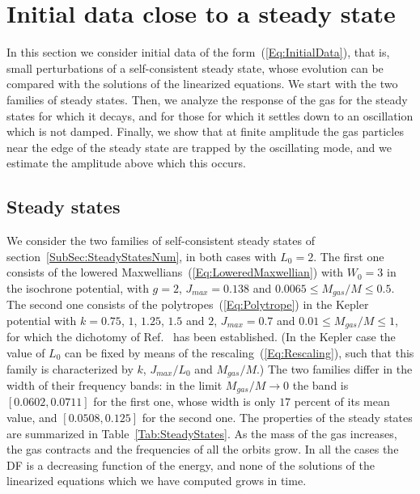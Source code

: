 \section{Initial data close to a steady state}
\label{Sec:FixedL}

In this section we consider initial data of the form~(\ref{Eq:InitialData}), that is, small perturbations of a self-consistent steady state, whose evolution can be compared with the solutions of the linearized equations. We start with the two families of steady states. Then, we analyze the response of the gas for the steady states for which it decays, and for those for which it settles down to an oscillation which is not damped. Finally, we show that at finite amplitude the gas particles near the edge of the steady state are trapped by the oscillating mode, and we estimate the amplitude above which this occurs.


\subsection{Steady states}
\label{SubSec:FixedLStates}

We consider the two families of self-consistent steady states of section~\ref{SubSec:SteadyStatesNum}, in both cases with $L_0 = 2$. The first one consists of the lowered Maxwellians~(\ref{Eq:LoweredMaxwellian}) with $W_0 = 3$ in the isochrone potential, with $g = 2$, $J_{max} = 0.138$ and $0.0065\leq M_{gas}/M\leq 0.5$. The second one consists of the polytropes~(\ref{Eq:Polytrope}) in the Kepler potential with $k = 0.75$, $1$, $1.25$, $1.5$ and $2$, $J_{max} = 0.7$ and $0.01\leq M_{gas}/M\leq 1$, for which the dichotomy of Ref.~\cite{mHgRmScS25} has been established. (In the Kepler case the value of $L_0$ can be fixed by means of the rescaling~(\ref{Eq:Rescaling}), such that this family is characterized by $k$, $J_{max}/L_0$ and $M_{gas}/M$.) The two families differ in the width of their frequency bands: in the limit $M_{gas}/M\to 0$ the band is $[0.0602,0.0711]$ for the first one, whose width is only $17$ percent of its mean value, and $[0.0508,0.125]$ for the second one. The properties of the steady states are summarized in Table~\ref{Tab:SteadyStates}. As the mass of the gas increases, the gas contracts and the frequencies of all the orbits grow. In all the cases the DF is a decreasing function of the energy, and none of the solutions of the linearized equations which we have computed grows in time.

